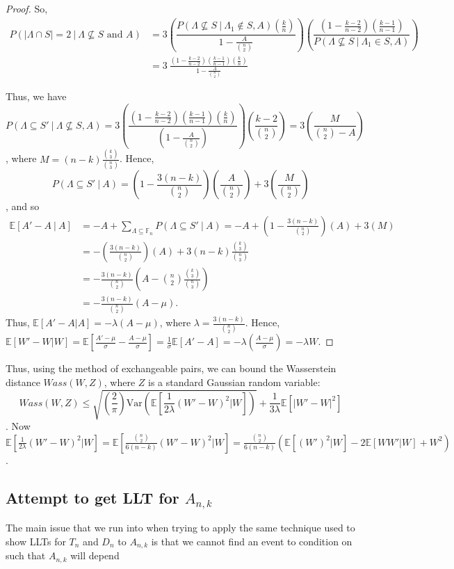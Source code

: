 \documentclass[12pt]{article} %
\newcommand{\p}[1]{\left(#1\right)}
\newcommand{\abs}[1]{\left\lvert#1\right\rvert}
\newcommand{\E}{\mathbb{E}}
\newcommand{\F}{\mathbb{F}}
\theoremstyle{definition}
\theoremstyle{remark}
\begin{document}
\begin{proof}
So,
\begin{align*}
P(\abs{\Lambda \cap S} = 2\ |\ \Lambda \not \subseteq S\text{ and } A) &= 3\p{\dfrac{P(\Lambda \not \subseteq S\ |\ \Lambda_1 \notin S, A)\p{\frac{k}{n}}}{1-\frac{A}{\binom{n}{2}}}}\p{\dfrac{\p{1-\frac{k-2}{n-2}}\p{\frac{k-1}{n-1}}}{P(\Lambda \not \subseteq S\ |\ \Lambda_1 \in S, A)}} \\
&= 3\ \frac{\p{1-\frac{k-2}{n-2}}\p{\frac{k-1}{n-1}}\p{\frac{k}{n}}}{1-\frac{A}{{n\choose2}}}
\end{align*}

Thus, we have 
\[P(\Lambda \subseteq S'\ |\ \Lambda \not \subseteq S, A) = 3 \p{\frac{\p{1-\frac{k-2}{n-2}}\p{\frac{k-1}{n-1}}\p{\frac{k}{n}}}{\p{1-\frac{A}{{n\choose2}}}}}\p{\frac{k-2}{{n\choose2}}} = 3\p{\frac{M}{{n\choose2} - A}}\], where $M = (n-k)\frac{{k\choose3}}{{n\choose3}}$. Hence,
\[P(\Lambda \subseteq S'\ |\ A) = \p{1 - \frac{3(n-k)}{{n\choose2}}}\p{\frac{A}{{n\choose2}}} + 3\p{\frac{M}{{n\choose2}}}
\],
and so
\begin{align*}
\E[A' - A\ |\ A] &= -A + \sum_{\Lambda \subseteq \F_n} P(\Lambda \subseteq S'\ |\ A)= -A + \p{1 - \frac{3(n-k)}{{n\choose2}}}\p{A} + 3\p{M} \\
&= -\p{\frac{3(n - k)}{{n\choose2}}}(A) + 3(n-k)\frac{{k\choose3}}{{n\choose3}} \\
&= -\frac{3(n-k)}{{n\choose2}}\p{A-\binom{n}{2}\frac{\binom{k}{3}}{\binom{n}{3}}} \\
&= -\frac{3(n-k)}{{n\choose2}}(A-\mu).
\end{align*}
Thus, 
$\E[A'-A |A] = -\lambda(A-\mu)$, where $\lambda = \frac{3(n-k)}{{n\choose2}}$. 
Hence, $\E[W'-W|W] = \E[\frac{A'-\mu}{\sigma} - \frac{A-\mu}{\sigma}] = \frac{1}{\sigma}\E[A'-A] = -\lambda\p{\frac{A-\mu}{\sigma}} = -\lambda W$.


\end{proof}

Thus, using the method of exchangeable pairs, we can bound the Wasserstein distance $Wass(W, Z)$, where $Z$ is a standard Gaussian random variable:
\[Wass(W,Z) \leq \sqrt{\p{\frac{2}{\pi}}\textrm{Var}(\E[\frac{1}{2\lambda}(W'-W)^2 | W])} + \frac{1}{3\lambda}\E[\abs{W'-W}^2]\].
Now $\E[\frac{1}{2\lambda}(W'-W)^2 | W] = \E[\frac{{n\choose2}}{6(n-k)}(W'-W)^2 | W] = \frac{{n\choose2}}{6(n-k)}(\E[(W')^2|W]-2\E[WW'|W]+W^2)$.


\subsection{Attempt to get LLT for $A_{n,k}$}
The main issue that we run into when trying to apply the same technique used to show LLTs for $T_n$ and $D_n$ to $A_{n,k}$ is that we cannot find an event to condition on such that $A_{n,k}$ will depend 
\end{document}
